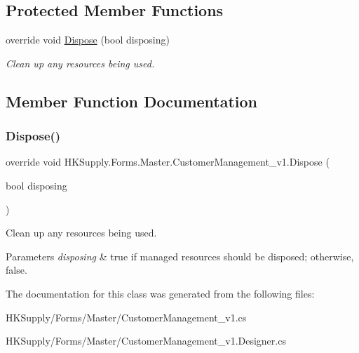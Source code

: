 \subsection*{Protected Member Functions}
\begin{DoxyCompactItemize}
\item 
override void \mbox{\hyperlink{class_h_k_supply_1_1_forms_1_1_master_1_1_customer_management__v1_a7be2bacc46fddc38352940796a1f13df}{Dispose}} (bool disposing)
\begin{DoxyCompactList}\small\item\em Clean up any resources being used. \end{DoxyCompactList}\end{DoxyCompactItemize}


\subsection{Member Function Documentation}
\mbox{\label{class_h_k_supply_1_1_forms_1_1_master_1_1_customer_management__v1_a7be2bacc46fddc38352940796a1f13df}} 
\subsubsection{\texorpdfstring{Dispose()}{Dispose()}}
{\footnotesize\ttfamily override void H\+K\+Supply.\+Forms.\+Master.\+Customer\+Management\+\_\+v1.\+Dispose (\begin{DoxyParamCaption}\item[{bool}]{disposing }\end{DoxyParamCaption})\hspace{0.3cm}{\ttfamily [protected]}}



Clean up any resources being used. 


\begin{DoxyParams}{Parameters}
{\em disposing} & true if managed resources should be disposed; otherwise, false.\\
\hline
\end{DoxyParams}


The documentation for this class was generated from the following files\+:\begin{DoxyCompactItemize}
\item 
H\+K\+Supply/\+Forms/\+Master/Customer\+Management\+\_\+v1.\+cs\item 
H\+K\+Supply/\+Forms/\+Master/Customer\+Management\+\_\+v1.\+Designer.\+cs\end{DoxyCompactItemize}
